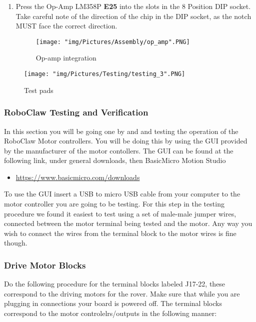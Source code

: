 \documentclass[12pt]{article}
\begin{document}
\begin{enumerate}

\item Press the Op-Amp LM358P \textbf{E25} into the slots in the 8 Position DIP socket. Take careful note of the direction of the chip in the DIP socket, as the notch MUST face the correct direction.


\begin{figure}[H]
  \centering
    \texttt{[image: "img/Pictures/Assembly/op\_amp".PNG]}
  \caption{Op-amp integration}
\end{figure}

\end{enumerate}

\begin{figure}[H]
  \centering
    \texttt{[image: "img/Pictures/Testing/testing\_3".PNG]}
  \caption{Test pads}
  \label{test_pads_1}
\end{figure}


\subsubsection{RoboClaw Testing and Verification}

In this section you will be going one by and and testing the operation of the RoboClaw Motor controllers. You will be doing this by using the GUI provided by the manufacturer of the motor contollers. The GUI can be found at the following link, under general downloads, then BasicMicro Motion Studio

\begin{itemize}
	\item \href{https://www.basicmicro.com/downloads}{https://www.basicmicro.com/downloads}
\end{itemize}


\noindent To use the GUI insert a USB to micro USB cable from your computer to the motor controller you are going to be testing. For this step in the testing procedure we found it easiest to test using a set of male-male jumper wires, connected between the motor terminal being tested and the motor. Any way you wish to connect the wires from the terminal block to the motor wires is fine though.

\subsubsection{Drive Motor Blocks}

\noindent Do the following procedure for the terminal blocks labeled J17-22, these correspond to the driving motors for the rover. Make sure that while you are plugging in connections your board is powered off.  The terminal blocks correspond to the motor controlelrs/outputs in the following manner:
\end{document}
